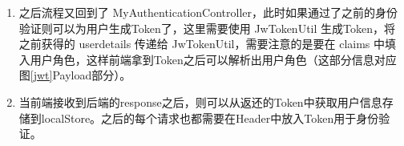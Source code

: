 \begin{enumerate}
\begin{lstlisting} [language = Java]
    }
              \end{lstlisting}
        DaoAuthenticationProvider 是继承 AbstractUserDetailsAuthenticationProvider 的，不同在于 DaoAuthenticationProvider 增加了验证密码的功能，这也正是我们需要的，但是验证密码需要查询数据库也就需要 UserDetailService，所以需要通过 MySecurityConfig 为 XXXAuthProvider 注入不同的 XXXUserDetialsService。这里选择setter注入：
        \begin{lstlisting} [language = Java]
  // XXXDaoAuthProvider
  @Override
  public void setUserDetailsService(
      UserDetailsService userDetailsService) {
      super.setUserDetailsService(userDetailsService);
  }
              \end{lstlisting}
        \begin{lstlisting} [language = Java]
  // MySecurityConfig
  @Autowired
  @Qualifier("XXXUserDetailsService")
  private UserDetailsService XXXUserDetailsService;

  // 注入
  @Bean("XXXDaoAutenticationProvider")
  DaoAuthenticationProvider daoXXXDaoAutenticationProvider() 
  {
    return new XXXDaoAutenticationProvider(
                                passwordEncoder(), 
                                XXXUserDetailsService);
  }
              \end{lstlisting}
        这个过程中涉及的类比较多且关系比较复杂，可以参考图\ref{SpringSecurityMultiUser}（经过简化，略去了与该流程相关程度不大的类）。
  \item 之后流程又回到了 MyAuthenticationController，此时如果通过了之前的身份验证则可以为用户生成Token了，这里需要使用 JwTokenUtil 生成Token，将 之前获得的 userdetails 传递给 JwTokenUtil，需要注意的是要在 claims 中填入用户角色，这样前端拿到Token之后可以解析出用户角色（这部分信息对应图\ref{jwt}Payload部分）。
  \item 当前端接收到后端的response之后，则可以从返还的Token中获取用户信息存储到localStore。之后的每个请求也都需要在Header中放入Token用于身份验证。
\end{enumerate}
